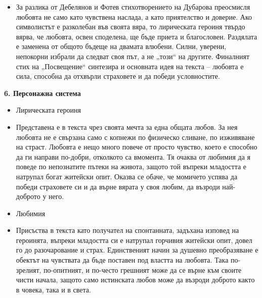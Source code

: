 \documentclass[12pt,a4paper]{article}
\begin{document}
\begin{itemize}[leftmargin=*]
\vspace{-0.65cm}
\item За разлика от Дебелянов и Фотев стихотворението на Дубарова преосмисля любовта не само като чувствена наслада, а като приятелство и доверие. Ако символистът е разколебан във своята вяра, то лирическата героиня твърдо вярва, че любовта, освен споделена, ще бъде приета и благословен. Раздялата е заменена от общото бъдеще на двамата влюбени. Силни, уверени, непокорни избрали да следват своя път, а не „този“ на другите. Финалният стих на „Посвещение“ синтезира и основната идея на текста – любовта е сила, способна да отхвърли страховете и да победи условностите.
\end{itemize}

\vspace{0.1cm}
 
\noindent 
\textbf{6. Персонажна система}
\begin{itemize}[leftmargin=*]
\vspace{-0.2cm}
\item Лирическата героиня
\end{itemize}

\begin{itemize}
\vspace{-0.65cm}
\item Представена е в текста чрез своята мечта за една общата любов. За нея любовта не е свързана само с копнежи по физическо сливане, по изживяване на страст. Любовта е нещо много повече от просто чувство, което е способно да ги направи по-добри, отколкото са вмомента. Тя очаква от любимия да я поведе по непознатите пътеки на живота, защото той въпреки младостта е натрупал богат житейски опит. Оказва се обаче, че момичето успява да победи страховете си и да върне вярата у своя любим, да възроди най-доброто у него.
\end{itemize}

\begin{itemize}[leftmargin=*]
\vspace{-0.65cm}
\item Любимия
\end{itemize}

\begin{itemize}
\vspace{-0.65cm}
\item Присъства в текста като получател на спонтанната, задъхана изповед на героинята, въпреки младостта си е натрупал горчивия житейски опит, довел го до разочарование и страх. Единственият начин за душевно преобразяване е обектът на чувствата да бъде поставен под властта на любовта. Така по-зрелият, по-опитният, и по-често грешният може да се върне към своите чисти начала, защото само истинската любов може да възроди доброто както в човека, така и в света.
\end{itemize}
\end{document}
